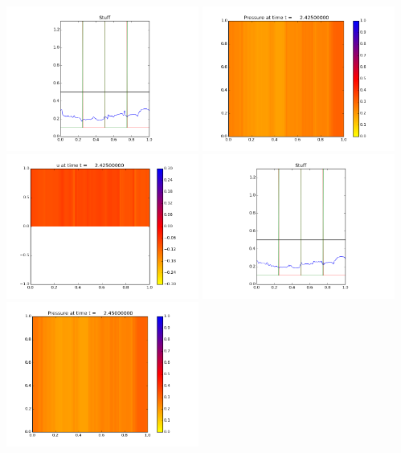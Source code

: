 \documentclass[11pt]{article}
\begin{document}
\vskip 10pt 
\includegraphics[width=0.475\textwidth]{frame0096fig3.png}
\vskip 10pt 
\includegraphics[width=0.475\textwidth]{frame0097fig0.png}
\includegraphics[width=0.475\textwidth]{frame0097fig1.png}
\vskip 10pt 
\includegraphics[width=0.475\textwidth]{frame0097fig3.png}
\vskip 10pt 
\includegraphics[width=0.475\textwidth]{frame0098fig0.png}
\end{document}

